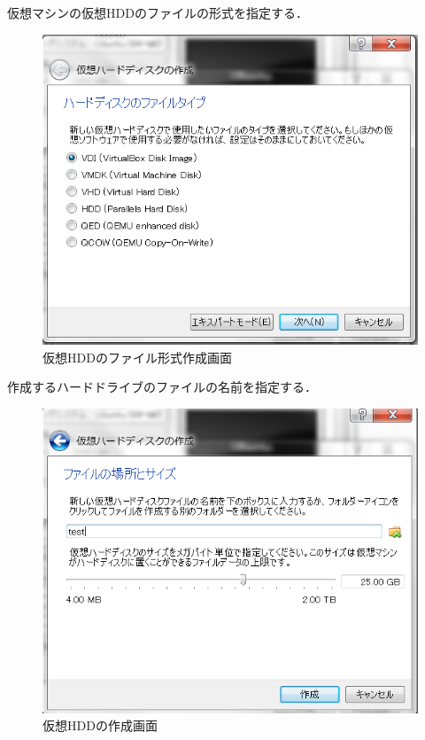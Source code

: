 仮想マシンの仮想HDDのファイルの形式を指定する．


\begin{figure}[H]
\centering
\includegraphics[width=15cm]{vb003.png}
\caption{仮想HDDのファイル形式作成画面}\label{仮想マシンの設定画面}
\end{figure}

作成するハードドライブのファイルの名前を指定する．



\begin{figure}[H]
\centering
\includegraphics[width=15cm]{vb004.png}
\caption{仮想HDDの作成画面}\label{仮想マシンの設定画面}
\end{figure}

